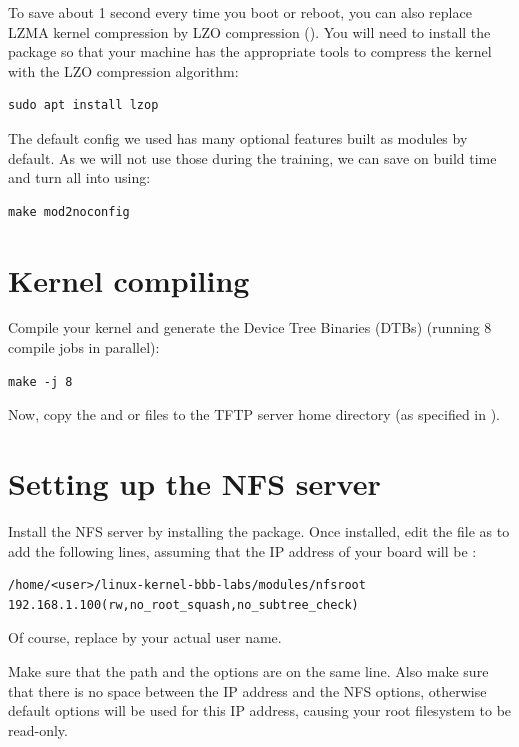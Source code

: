 To save about 1 second every time you boot or reboot, you can also
replace LZMA kernel compression by LZO compression
(). You will need to install the 
package so that your machine has the appropriate tools to compress the
kernel with the LZO compression algorithm:

\begin{verbatim}
sudo apt install lzop
\end{verbatim}

The default config we used has many optional features built as modules
by default. As we will not use those during the training, we can save
on build time and turn all  into  using:

\begin{verbatim}
make mod2noconfig
\end{verbatim}

\section{Kernel compiling}

Compile your kernel and generate the Device Tree Binaries (DTBs)
(running 8 compile jobs in parallel):

\begin{verbatim}
make -j 8
\end{verbatim}

Now, copy the  and 
or  files
to the TFTP server home directory (as specified in ).

\section{Setting up the NFS server}

Install the NFS server by installing the 
package. Once installed, edit the  file as
 to add the following lines, assuming that the IP address
of your board will be :

\scriptsize
\begin{verbatim}
/home/<user>/linux-kernel-bbb-labs/modules/nfsroot 192.168.1.100(rw,no_root_squash,no_subtree_check)
\end{verbatim}
\normalsize

Of course, replace  by your actual user name.

Make sure that the path and the options are on the same line.
Also make sure that there is no space between the IP address and the NFS
options, otherwise default options will be used for this IP address,
causing your root filesystem to be read-only.

